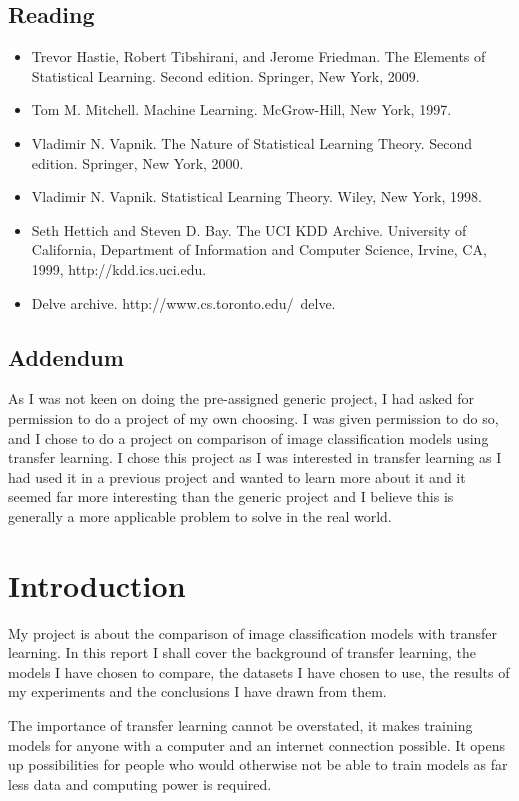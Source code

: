 \documentclass[]{final_report}
\begin{document}
\section{Reading}
\begin{itemize}
  \item Trevor Hastie, Robert Tibshirani, and Jerome Friedman. The Elements of Statistical Learning. Second edition. Springer, New York, 2009.
  \item Tom M. Mitchell. Machine Learning. McGrow-Hill, New York, 1997.
  \item Vladimir N. Vapnik. The Nature of Statistical Learning Theory. Second edition. Springer, New York, 2000.
  \item Vladimir N. Vapnik. Statistical Learning Theory. Wiley, New York, 1998.
  \item Seth Hettich and Steven D. Bay. The UCI KDD Archive. University of California, Department of Information and Computer Science, Irvine, CA, 1999, http://kdd.ics.uci.edu.
  \item Delve archive. http://www.cs.toronto.edu/~delve.
\end{itemize}

\section{Addendum}
As I was not keen on doing the pre-assigned generic project, I had asked for permission to do a project of my own choosing.
I was given permission to do so, and I chose to do a project on comparison of image classification models using transfer learning.
I chose this project as I was interested in transfer learning as I had used it in a previous project and wanted to learn more about it
and it seemed far more interesting than the generic project and I believe this is generally a more applicable problem to solve in the real world.


\chapter{Introduction}

My project is about the comparison of image classification models with transfer learning.
In this report I shall cover the background of transfer learning, the models I have chosen to compare,
the datasets I have chosen to use, the results of my experiments and the conclusions I have drawn from them.

The importance of transfer learning cannot be overstated, it makes training models for anyone with a computer and an internet connection possible.
It opens up possibilities for people who would otherwise not be able to train models as far less data and computing power is required.
\end{document}
